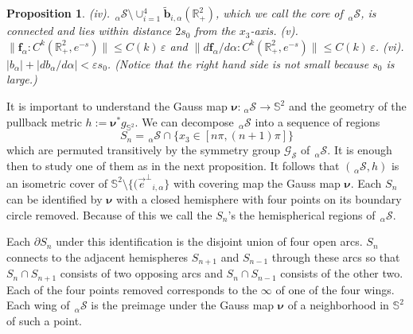 \documentclass[12pt,namelimits,sumlimits]{amsart}
\newtheorem{prop}[theorem]{Proposition}
\theoremstyle{remark}
\numberwithin{equation}{section}
\begin{document}
\begin{prop}
\newline
(iv).
${{{}_{\,\alpha\!}\mathcal{S}}}\setminus\cup_{i=1}^4{\widetilde{\boldsymbol{b}}}_{{i,\alpha}}({\mathbb{R}}^2_+)$,
which we call the core of ${{{}_{\,\alpha\!}\mathcal{S}}}$,
is connected and lies within distance $2s_0$ from the $x_3$-axis.
\newline
(v).
$\|{\boldsymbol{f}_\alpha}:C^k({\mathbb{R}}^2_+,e^{-s}) \|\le C(k)\,\varepsilon$
and
$\|d{\boldsymbol{f}_\alpha}/d\alpha:C^k({\mathbb{R}}^2_+,e^{-s}) \|\le C(k)\,\varepsilon$.
\newline
(vi). $ |b_\alpha| + |db_\alpha/d\alpha| < \varepsilon s_0$.
(Notice that the right hand side is not small because $s_0$
is large.)
\end{prop}

It is important to understand the Gauss map ${\boldsymbol{\nu}}:{{{}_{\,\alpha\!}\mathcal{S}}}\to{{{\mathbb{S}}^2}}$
and the geometry of the pullback metric
$h:={\boldsymbol{\nu}}^*g_{{{\mathbb{S}}^2}}$.
We can decompose ${{{}_{\,\alpha\!}\mathcal{S}}}$ into a sequence of regions
$$
S_n={{{}_{\,\alpha\!}\mathcal{S}}}\cap\{x_3\in[n\pi,(n+1)\pi]\}
$$
which are permuted transitively by the symmetry group ${{\mathscr{G}_{{\mathcal{S}}}}}$ of ${{{}_{\,\alpha\!}\mathcal{S}}}$.
It is enough then to study one of them as in the next proposition.
It follows that $({{{}_{\,\alpha\!}\mathcal{S}}},h)$ is
an isometric cover of
${{{\mathbb{S}}^2}}\setminus\{({{\vec{e}^\perp}}_{{i,\alpha}}\}$
with covering map the Gauss map ${\boldsymbol{\nu}}$.
Each $S_n$ can be identified by ${\boldsymbol{\nu}}$
with a closed hemisphere with four points
on its boundary circle removed.
Because of this we call the $S_n$'s the hemispherical regions of ${{{}_{\,\alpha\!}\mathcal{S}}}$.

Each $\partial S_n$ under this identification is the disjoint
union of four open arcs.
$S_n$ connects to the adjacent hemispheres $S_{n+1}$ and $S_{n-1}$
through these arcs so that
$S_n\cap S_{n+1}$ consists of two opposing arcs 
and
$S_n\cap S_{n-1}$ consists of the other two.
Each of the four points removed corresponds to the $\infty$
of one of the four wings.
Each wing of ${{{}_{\,\alpha\!}\mathcal{S}}}$ is the preimage under the Gauss map ${\boldsymbol{\nu}}$
of a neighborhood in ${{{\mathbb{S}}^2}}$ of such a point.
\end{document}
